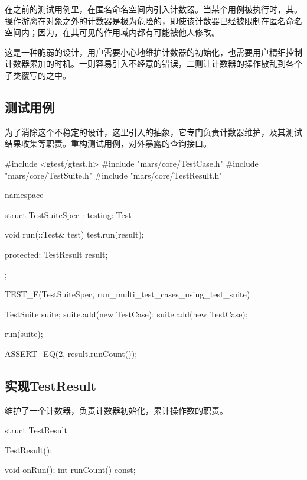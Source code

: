 \begin{content}

在之前的测试用例里，在匿名命名空间内引入计数器。当某个用例被执行时，其。操作游离在对象之外的计数器是极为危险的，即使该计数器已经被限制在匿名命名空间内；因为，在其可见的作用域内都有可能被他人修改。

这是一种脆弱的设计，用户需要小心地维护计数器的初始化，也需要用户精细控制计数器累加的时机。一则容易引入不经意的错误，二则让计数器的操作散乱到各个子类覆写的之中。

\subsection{测试用例}

为了消除这个不稳定的设计，这里引入的抽象，它专门负责计数器维护，及其测试结果收集等职责。重构测试用例，对外暴露的查询接口。

\begin{leftbar}
 \begin{c++}[caption={\ttfamily{test/mars/core/TestSuiteSpec.cc}}]
#include <gtest/gtest.h>
#include "mars/core/TestCase.h"
#include "mars/core/TestSuite.h"
#include "mars/core/TestResult.h"

namespace {
  struct TestSuiteSpec : testing::Test {
    void run(::Test& test) {
      test.run(result);
    }

  protected:
    TestResult result;
  };
}

TEST_F(TestSuiteSpec, run_multi_test_cases_using_test_suite) {
  TestSuite suite;
  suite.add(new TestCase);
  suite.add(new TestCase);

  run(suite);

  ASSERT_EQ(2, result.runCount());
}
 \end{c++}
\end{leftbar}

\subsection{实现TestResult}

维护了一个计数器，负责计数器初始化，累计操作数的职责。

\begin{leftbar}
 \begin{c++}[caption={\ttfamily{include/mars/core/TestResult.h}}]
struct TestResult {
  TestResult();

  void onRun();
  int runCount() const;

}
\end{c++}
\end{leftbar}
\end{content}
